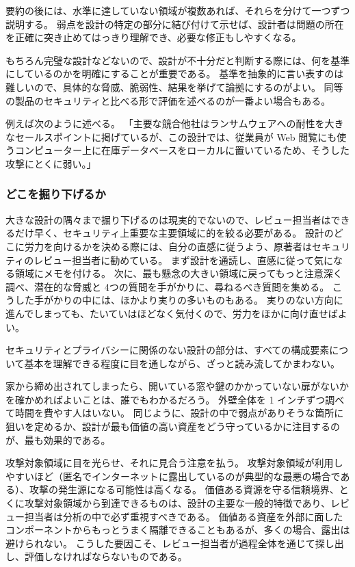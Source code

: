 \documentclass[uplatex]{jsarticle}
\def\label#1{}%
\begin{document}
要約の後には、水準に達していない領域が複数あれば、それらを分けて一つずつ説明する。
弱点を設計の特定の部分に結び付けて示せば、設計者は問題の所在を正確に突き止めてはっきり理解でき、必要な修正もしやすくなる。

もちろん完璧な設計などないので、設計が不十分だと判断する際には、何を基準にしているのかを明確にすることが重要である。
基準を抽象的に言い表すのは難しいので、具体的な脅威、脆弱性、結果を挙げて論拠にするのがよい。
同等の製品のセキュリティと比べる形で評価を述べるのが一番よい場合もある。

\begin{exa}[競合製品との比較による評価]\label{exa:ch7-ransomware-comparison}
例えば次のように述べる。
「主要な競合他社はランサムウェアへの耐性を大きなセールスポイントに掲げているが、この設計では、従業員が Web 閲覧にも使うコンピューター上に在庫データベースをローカルに置いているため、そうした攻撃にとくに弱い。」
\end{exa}

\subsubsection{どこを掘り下げるか}

大きな設計の隅々まで掘り下げるのは現実的でないので、レビュー担当者はできるだけ早く、セキュリティ上重要な主要領域に的を絞る必要がある。
設計のどこに労力を向けるかを決める際には、自分の直感に従うよう、原著者はセキュリティのレビュー担当者に勧めている。
まず設計を通読し、直感に従って気になる領域にメモを付ける。
次に、最も懸念の大きい領域に戻ってもっと注意深く調べ、潜在的な脅威と 4つの質問を手がかりに、尋ねるべき質問を集める。
こうした手がかりの中には、ほかより実りの多いものもある。
実りのない方向に進んでしまっても、たいていはほどなく気付くので、労力をほかに向け直せばよい。

セキュリティとプライバシーに関係のない設計の部分は、すべての構成要素について基本を理解できる程度に目を通しながら、ざっと読み流してかまわない。

\begin{exa}[家から締め出されたとき]\label{exa:ch7-locked-out}
家から締め出されてしまったら、開いている窓や鍵のかかっていない扉がないかを確かめればよいことは、誰でもわかるだろう。
外壁全体を 1 インチずつ調べて時間を費やす人はいない。
同じように、設計の中で弱点がありそうな箇所に狙いを定めるか、設計が最も価値の高い資産をどう守っているかに注目するのが、最も効果的である。
\end{exa}

攻撃対象領域に目を光らせ、それに見合う注意を払う。
攻撃対象領域が利用しやすいほど（匿名でインターネットに露出しているのが典型的な最悪の場合である）、攻撃の発生源になる可能性は高くなる。
価値ある資源を守る信頼境界、とくに攻撃対象領域から到達できるものは、設計の主要な一般的特徴であり、レビュー担当者は分析の中で必ず重視すべきである。
価値ある資産を外部に面したコンポーネントからもっとうまく隔離できることもあるが、多くの場合、露出は避けられない。
こうした要因こそ、レビュー担当者が過程全体を通じて探し出し、評価しなければならないものである。
\end{document}
